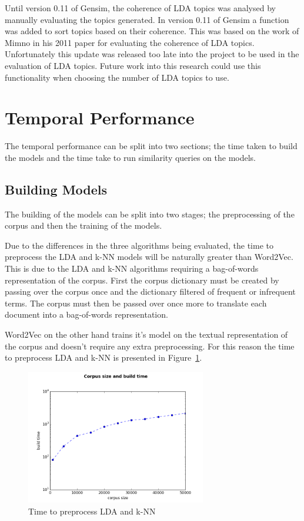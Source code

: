 Until version 0.11 of Gensim, the coherence of LDA topics was analysed by manually evaluating the topics generated.
In version 0.11 of Gensim a function was added to sort topics based on their coherence.
This was based on the work of Mimno in his 2011 paper for evaluating the coherence of LDA topics.
Unfortunately this update was released too late into the project to be used in the evaluation of LDA topics.
Future work into this research could use this functionality when choosing the number of LDA topics to use.

\section{Temporal Performance}
The temporal performance can be split into two sections; the time taken to build the models and the time take to run similarity queries on the models.

\subsection{Building Models}
The building of the models can be split into two stages;
the preprocessing of the corpus and then the training of the models.

Due to the differences in the three algorithms being evaluated, the time to preprocess the LDA and k-NN models will be naturally greater than Word2Vec.
This is due to the LDA and k-NN algorithms requiring a bag-of-words representation of the corpus.
First the corpus dictionary must be created by passing over the corpus once and the dictionary filtered of frequent or infrequent terms.
The corpus must then be passed over once more to translate each document into a bag-of-words representation.

Word2Vec on the other hand trains it's model on the textual representation of the corpus and doesn't require any extra preprocessing.
For this reason the time to preprocess LDA and k-NN is presented in Figure~\ref{fig:BuildBow}.

\begin{figure}[h]
    \centering
        \includegraphics[width=0.7\textwidth]{Figures/BuildBOW.png}
    \caption{Time to preprocess LDA and k-NN}
    \label{fig:BuildBow}
\end{figure}


